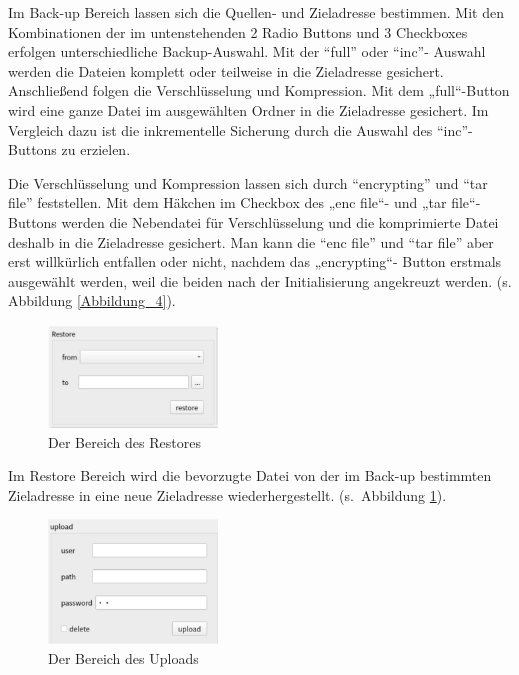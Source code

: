 Im Back-up Bereich lassen sich die Quellen- und Zieladresse bestimmen.  Mit den Kombinationen der im untenstehenden 2 Radio Buttons und 3 Checkboxes erfolgen  unterschiedliche Backup-Auswahl. Mit der “full” oder “inc”- Auswahl werden die Dateien komplett oder teilweise in die Zieladresse gesichert. Anschließend folgen die Verschlüsselung und Kompression. Mit dem „full“-Button wird eine ganze Datei im ausgewählten Ordner in die Zieladresse gesichert. Im Vergleich dazu ist die inkrementelle Sicherung durch die Auswahl  des “inc”-Buttons  zu erzielen. 
\par Die Verschlüsselung und Kompression lassen sich durch “encrypting” und “tar file” feststellen. Mit dem Häkchen im Checkbox des „enc file“- und „tar file“-Buttons werden die Nebendatei für Verschlüsselung und die komprimierte Datei deshalb in die Zieladresse gesichert.  Man kann die “enc file” und “tar file” aber erst willkürlich entfallen oder nicht, nachdem das „encrypting“- Button erstmals ausgewählt werden, weil die beiden nach der Initialisierung angekreuzt werden. (s. Abbildung \ref{Abbildung_4}).

\begin{figure}[h!]
	\centering
	\includegraphics[width=0.4\textwidth]{bilder/restore.png}
	\caption{Der Bereich des Restores  }
	\label{Abbildung_5}
\end{figure}

Im Restore Bereich wird die bevorzugte Datei von der im Back-up bestimmten Zieladresse in eine neue Zieladresse wiederhergestellt. (s. Abbildung \ref{Abbildung_5}).

\begin{figure}[h!]
	\centering
	\includegraphics[width=0.4\textwidth]{bilder/upload.png}
	\caption{Der Bereich des Uploads  }
	\label{Abbildung_6}
\end{figure}

